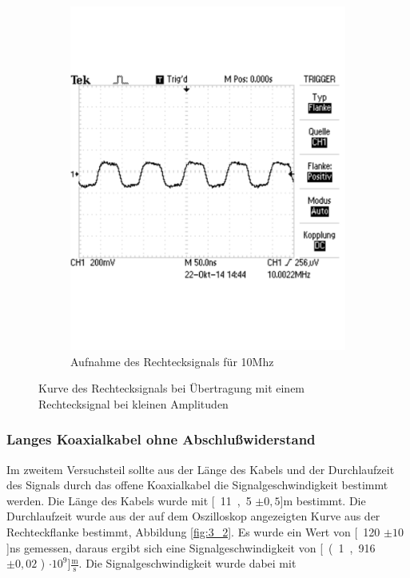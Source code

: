\documentclass[12pt,a4paper]{article}
\begin{document}
\begin{figure}[H]
\begin{subfigure}[b]{0.48\textwidth}
                \includegraphics[width=\textwidth , scale = 0.4]{3_1_10mhz.pdf}
                \caption[Aufnahme des Rechtecksignals für 10Mhz]{Aufnahme des Rechtecksignals für 10Mhz}
  				\label{fig:3_1_mhz}
        \end{subfigure}
        \caption{Kurve des Rechtecksignals bei Übertragung mit einem Rechtecksignal bei kleinen Amplituden}
        \label{fig:3_1_vergleich}
\end{figure}



\subsubsection{Langes Koaxialkabel ohne Abschlußwiderstand}

Im zweitem Versuchsteil sollte aus der Länge des Kabels und der Durchlaufzeit des Signals durch das offene Koaxialkabel die Signalgeschwindigkeit bestimmt werden. Die Länge des Kabels wurde mit \unit[11,5 $\pm 0,5$]{m} bestimmt. Die Durchlaufzeit wurde aus der auf dem Oszilloskop angezeigten Kurve aus der Rechteckflanke bestimmt, Abbildung \ref{fig:3_2}. Es wurde ein Wert von \unit[120 $\pm10$]{ns} gemessen, daraus ergibt sich eine Signalgeschwindigkeit von \unit[(1,916 $\pm 0,02$ ) $\cdot 10^9$]{$\frac{\text{m}}{\text{s}}$}. Die Signalgeschwindigkeit wurde dabei mit 
\end{document}
